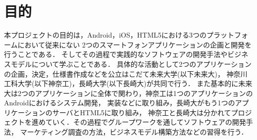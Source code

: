 \section{目的}
\par 本プロジェクトの目的は，Android，iOS，HTML5における3つのプラットフォームにおいて従来にない
2つのスマートフォンアプリケーションの企画と開発を行うことである．
そしてその過程で実践的なソフトウェアの開発手法やビジネスモデルについて学ぶことである．
具体的な活動として2つのアプリケーションの企画，決定，仕様書作成などを公立はこだて未来大学(以下未来大)，
神奈川工科大学(以下神奈工)，長崎大学(以下長崎大)が共同で行う．
また基本的に未来大は2つのアプリケーションに全体で関わり，神奈工は1つのアプリケーションのAndroidにおけるシステム開発，
実装などに取り組み，長崎大がもう1つのアプリケーションのサーバとHTML5に取り組み，
神奈工と長崎大は分かれてプロジェクトを進めていく．その過程でグループワークを通してソフトウェアの開発手法，
マーケティング調査の方法，ビジネスモデル構築方法などの習得を行う．
